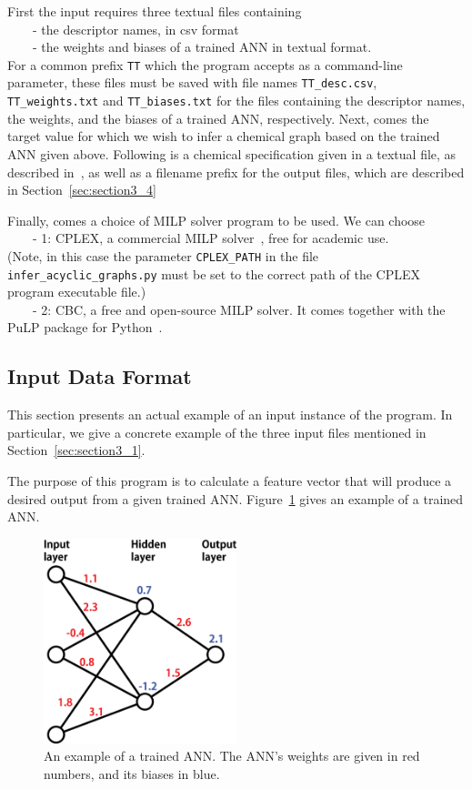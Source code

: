 \documentclass[11pt,titlepage,dvipdfmx,twoside]{book}
\begin{document}
First
the input requires three textual files containing \\
~~~~- the descriptor names, in csv format \\
~~~~- the weights and biases of a trained ANN in textual format.\\
For a common prefix {\tt TT} which the program accepts as a command-line parameter,
these files must be saved with file names {\tt TT\_desc.csv}, 
{\tt TT\_weights.txt} and {\tt TT\_biases.txt} for the files containing
the descriptor names, the weights, and the biases of a trained ANN, respectively.
%
Next, comes the target value for which we wish to infer 
a chemical graph based on the trained ANN given above.
Following is a chemical specification given in a textual file,
as described in~\cite{AN20}, 
as well as a filename prefix for the output files,  which are described in Section~\ref{sec:section3_4}

Finally, comes a choice of MILP solver program to be used.
We can choose \\
~~~~- 1: CPLEX, a commercial MILP solver~\cite{cplex}, free for academic use. \\
(Note, in this case the parameter {\tt CPLEX\_PATH} in the file {\tt infer\_acyclic\_graphs.py}
must be set to the correct path of the CPLEX program executable file.) \\
~~~~- 2: CBC, a free and open-source MILP solver. 
It comes together with the PuLP package for Python~\cite{PuLP1}.




\subsection{Input Data Format}
\label{sec:section3_2}

This section presents an actual example of an input instance of the program.
In particular, we give a concrete example of the three input files
mentioned in Section~\ref{sec:section3_1}.

The purpose of this program is to calculate a feature vector that will produce a desired output from a 
given trained ANN.
Figure~\ref{fig:sample} gives an example of a trained ANN.


\begin{figure}[H]
  \centering
  \includegraphics[width=0.5\textwidth]{./fig/ANN_sample_en}
  \caption{An example of a trained ANN.
		      The ANN's weights are given in red numbers, and
		      its biases in blue.
		    }
  \label{fig:sample}
\end{figure}
\end{document}
